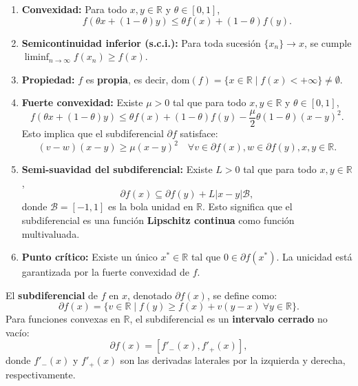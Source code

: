 \documentclass[12pt]{book}
\theoremstyle{definition}
\theoremstyle{plain}
\theoremstyle{remark}
\begin{document}
\begin{enumerate}
    \item \textbf{Convexidad:}
      Para todo \( x, y \in \mathbb{R} \) y \( \theta \in [0,1] \),
      \[
      f(\theta x + (1-\theta) y) \leq \theta f(x) + (1-\theta) f(y).
      \]

    \item \textbf{Semicontinuidad inferior (s.c.i.):}
      Para toda sucesión \( \{x_n\} \to x \), se cumple \( \liminf_{n \to \infty} f(x_n) \geq f(x) \).

    \item \textbf{Propiedad:}
      \( f \) es \textbf{propia}, es decir, \( \text{dom}(f) = \{ x \in \mathbb{R} \mid f(x) < +\infty \} \neq \emptyset \).

    \item \textbf{Fuerte convexidad:}
      Existe \( \mu > 0 \) tal que para todo \( x, y \in \mathbb{R} \) y \( \theta \in [0,1] \),
      \[
      f(\theta x + (1-\theta) y) \leq \theta f(x) + (1-\theta) f(y) - \frac{\mu}{2} \theta (1-\theta) (x - y)^2.
      \]
      Esto implica que el subdiferencial \( \partial f \) satisface:
      \[
      (v - w)(x - y) \geq \mu (x - y)^2 \quad \forall v \in \partial f(x), w \in \partial f(y), x, y \in \mathbb{R}.
      \]

    \item \textbf{Semi-suavidad del subdiferencial:}
      Existe \( L > 0 \) tal que para todo \( x, y \in \mathbb{R} \),
      \[
      \partial f(x) \subseteq \partial f(y) + L |x - y| \mathcal{B},
      \]
      donde \( \mathcal{B} = [-1, 1] \) es la bola unidad en \( \mathbb{R} \). Esto significa que el subdiferencial es una función \textbf{Lipschitz continua} como función multivaluada.

    \item \textbf{Punto crítico:}
      Existe un único \( x^* \in \mathbb{R} \) tal que \( 0 \in \partial f(x^*) \). La unicidad está garantizada por la fuerte convexidad de \( f \).
\end{enumerate}

\medskip
El \textbf{subdiferencial} de \( f \) en \( x \), denotado \( \partial f(x) \), se define como:
\[
\partial f(x) = \{ v \in \mathbb{R} \mid f(y) \geq f(x) + v(y - x) \ \forall y \in \mathbb{R} \}.
\]
Para funciones convexas en \( \mathbb{R} \), el subdiferencial es un \textbf{intervalo cerrado} no vacío:
\[
\partial f(x) = [f'_-(x), f'_+(x)],
\]
donde \( f'_-(x) \) y \( f'_+(x) \) son las derivadas laterales por la izquierda y derecha, respectivamente.
\end{document}
